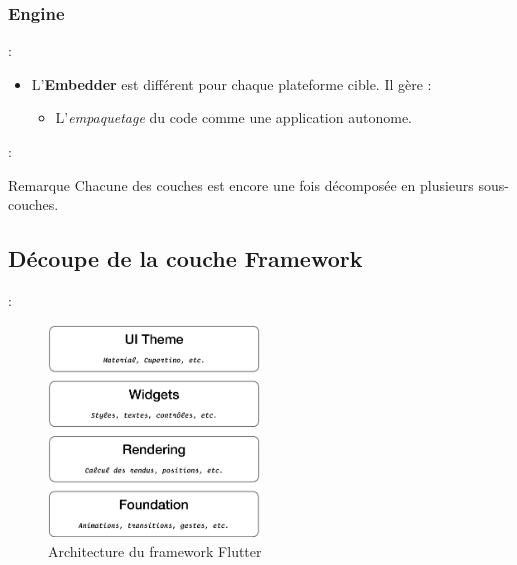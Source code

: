 \documentclass[10pt]{beamer}
\begin{document}
\subsubsection{Engine}
\begin{frame}[fragile,t]{\secname : \subsecname}
    \begin{itemize}
        \item L'\textbf{Embedder} est différent pour chaque plateforme cible. Il gère :
              \begin{itemize}
                  \item L'\textit{empaquetage} du code comme une application autonome.
              \end{itemize}
    \end{itemize}
\end{frame}

\begin{frame}[fragile,t]{\secname : \subsecname}
    \begin{block}{Remarque}
        Chacune des couches est encore une fois décomposée en plusieurs sous-couches.
    \end{block}
\end{frame}

\subsection{Découpe de la couche Framework}
\begin{frame}[fragile,t]{\secname : \subsecname}
    \begin{figure}[H]
        \begin{center}
            \includegraphics[width=0.5\textwidth]{../assets/img/architecture-framework.eps}
            \caption*{Architecture du framework Flutter}
            \label{Fig:architecture-framework}
        \end{center}
    \end{figure}
\end{frame}
\end{document}
